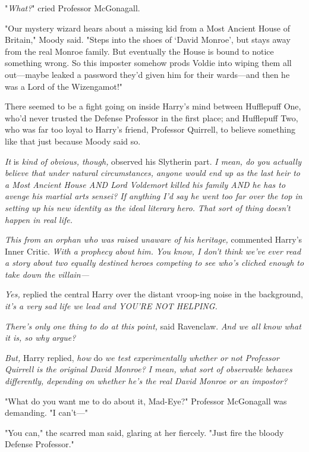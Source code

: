 "\emph{What?}" cried Professor McGonagall.

"Our mystery wizard hears about a missing kid from a Most Ancient House of 
Britain," Moody said. "Steps into the shoes of `David Monroe', but stays away 
from the real Monroe family. But eventually the House is bound to notice 
something wrong. So this imposter somehow prods Voldie into wiping them all 
out---maybe leaked a password they'd given him for their wards---and then he 
was a Lord of the Wizengamot!"

There seemed to be a fight going on inside Harry's mind between Hufflepuff One, 
who'd never trusted the Defense Professor in the first place; and Hufflepuff 
Two, who was far too loyal to Harry's friend, Professor Quirrell, to believe 
something like that just because Moody said so.

\emph{It} is \emph{kind of obvious, though,} observed his Slytherin part. 
\emph{I mean, do you actually believe that under natural circumstances, anyone 
would end up as the last heir to a Most Ancient House AND Lord Voldemort killed 
his family AND he has to avenge his martial arts sensei? If anything I'd say he 
went too far over the top in setting up his new identity as the ideal literary 
hero. That sort of thing doesn't happen in real life.} 

\emph{This from an orphan who was raised unaware of his heritage,} commented 
Harry's Inner Critic. \emph{With a prophecy about him. You know, I don't think 
we've ever read a story about two equally destined heroes competing to see 
who's cliched enough to take down the villain---}

\emph{Yes,} replied the central Harry over the distant vroop-ing noise in the 
background, \emph{it's a very sad life we lead and YOU'RE NOT HELPING.}

\emph{There's only one thing to do at this point,} said Ravenclaw. \emph{And we 
all know what it is, so why argue?}

\emph{But,} Harry replied, \emph{how} do \emph{we test experimentally whether 
or not Professor Quirrell is the original David Monroe? I mean, what sort of 
observable behaves differently, depending on whether he's the real David Monroe 
or an impostor?}

"What do you want me to do about it, Mad-Eye?" Professor McGonagall was 
demanding. "I can't---"

"You can," the scarred man said, glaring at her fiercely. "Just fire the bloody 
Defense Professor."

